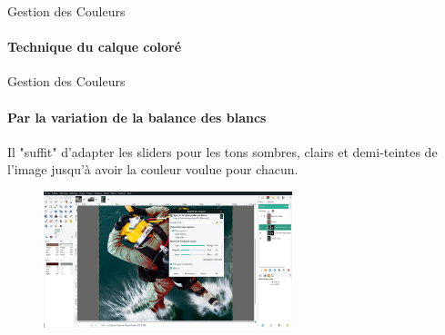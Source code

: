 \documentclass[10pt,svgnames,usenames,table]{beamer}
\begin{document}
	\begin{frame}{Gestion des Couleurs}
	\framesubtitle{Technique du calque coloré}
		\begin{enumerate}
		\end{enumerate}

		
	\end{frame}	

	\begin{frame}{Gestion des Couleurs}
	\framesubtitle{Par la variation de la balance des blancs}
		Il "suffit" d'adapter les sliders pour les tons sombres, clairs et demi-teintes de l'image jusqu'à avoir la couleur voulue pour chacun.
		\begin{figure}[H]
			\centering
				\includegraphics[height=150px]{Images/colours/col9} 
			\end{figure}		
	\end{frame}
\end{document}
